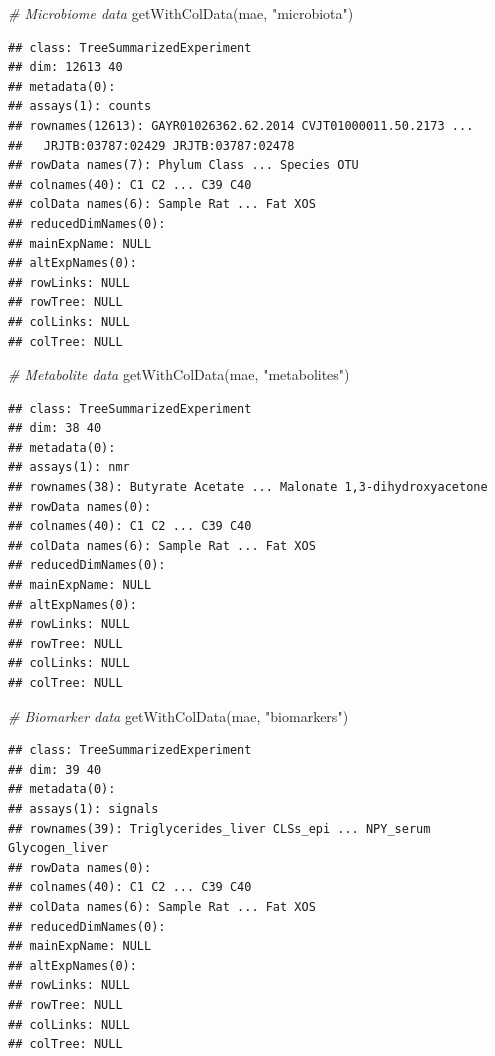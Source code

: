 \documentclass[
]{book}
\newenvironment{Shaded}{\begin{snugshade}}{\end{snugshade}}
\newcommand{\CommentTok}[1]{\textcolor[rgb]{0.56,0.35,0.01}{\textit{#1}}}
\newcommand{\FunctionTok}[1]{\textcolor[rgb]{0.00,0.00,0.00}{#1}}
\newcommand{\NormalTok}[1]{#1}
\newcommand{\StringTok}[1]{\textcolor[rgb]{0.31,0.60,0.02}{#1}}
\begin{document}
\begin{Shaded}
\begin{Highlighting}[]
\CommentTok{\# Microbiome data}
\FunctionTok{getWithColData}\NormalTok{(mae, }\StringTok{"microbiota"}\NormalTok{)}
\end{Highlighting}
\end{Shaded}

\begin{verbatim}
## class: TreeSummarizedExperiment 
## dim: 12613 40 
## metadata(0):
## assays(1): counts
## rownames(12613): GAYR01026362.62.2014 CVJT01000011.50.2173 ...
##   JRJTB:03787:02429 JRJTB:03787:02478
## rowData names(7): Phylum Class ... Species OTU
## colnames(40): C1 C2 ... C39 C40
## colData names(6): Sample Rat ... Fat XOS
## reducedDimNames(0):
## mainExpName: NULL
## altExpNames(0):
## rowLinks: NULL
## rowTree: NULL
## colLinks: NULL
## colTree: NULL
\end{verbatim}

\begin{Shaded}
\begin{Highlighting}[]
\CommentTok{\# Metabolite data}
\FunctionTok{getWithColData}\NormalTok{(mae, }\StringTok{"metabolites"}\NormalTok{)}
\end{Highlighting}
\end{Shaded}

\begin{verbatim}
## class: TreeSummarizedExperiment 
## dim: 38 40 
## metadata(0):
## assays(1): nmr
## rownames(38): Butyrate Acetate ... Malonate 1,3-dihydroxyacetone
## rowData names(0):
## colnames(40): C1 C2 ... C39 C40
## colData names(6): Sample Rat ... Fat XOS
## reducedDimNames(0):
## mainExpName: NULL
## altExpNames(0):
## rowLinks: NULL
## rowTree: NULL
## colLinks: NULL
## colTree: NULL
\end{verbatim}

\begin{Shaded}
\begin{Highlighting}[]
\CommentTok{\# Biomarker data}
\FunctionTok{getWithColData}\NormalTok{(mae, }\StringTok{"biomarkers"}\NormalTok{)}
\end{Highlighting}
\end{Shaded}

\begin{verbatim}
## class: TreeSummarizedExperiment 
## dim: 39 40 
## metadata(0):
## assays(1): signals
## rownames(39): Triglycerides_liver CLSs_epi ... NPY_serum Glycogen_liver
## rowData names(0):
## colnames(40): C1 C2 ... C39 C40
## colData names(6): Sample Rat ... Fat XOS
## reducedDimNames(0):
## mainExpName: NULL
## altExpNames(0):
## rowLinks: NULL
## rowTree: NULL
## colLinks: NULL
## colTree: NULL
\end{verbatim}
\end{document}
